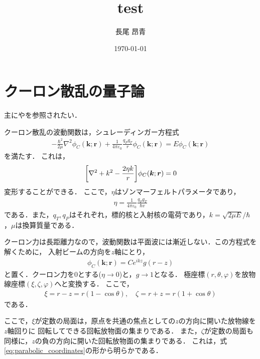 \documentclass[a4paper,11pt]{ltjsarticle}
\begin{document}
\title{test}
\author{長尾 昂青}
\date{\today}
\maketitle

\tableofcontents

\newpage
\section{クーロン散乱の量子論}

主に\cite{canto2013scattering}や\cite{BN00026961}を参照されたい．

クーロン散乱の波動関数は，シュレーディンガー方程式
\begin{align}\label{eq:coulomb_scattering_schrodinger}
  - \frac{\hbar^2}{2 \mu} \nabla^2 \phi_C(\bm{k}; \bm{r}) 
  + \frac{1}{4 \pi \varepsilon_0} \frac{q_P q_T}{r} \phi_C(\bm{k}; \bm{r}) = E\phi_C(\bm{k}; \bm{r})
\end{align}
を満たす．
これは，
\begin{align}\label{eq:coulomb_s_schro_rev}
  \qty[\nabla^2 + k^2- \frac{2\eta k}{r}] \phi_C(\bm{k}; \bm{r}) = 0
\end{align}
変形することができる．
ここで，$\eta$はゾンマーフェルトパラメータであり，
\begin{align}
  \eta = \frac{1}{4 \pi \varepsilon_0} \frac{q_P q_T}{\hbar v}
\end{align}
である．また，$q_T, q_P$はそれぞれ，標的核と入射核の電荷であり，$k = \sqrt{2\mu E}/\hbar$，$\mu$は換算質量である．

クーロン力は長距離力なので，波動関数は平面波には漸近しない．この方程式を解くために，
入射ビームの方向を$z$軸にとり，
\begin{align}\label{eq:coulomb_s_initial_ansatz}
  \phi_C(\bm{k};\bm{r}) = C e^{ikz}g(r-z)
\end{align}
と置く．クーロン力を0とする($\eta \rightarrow 0$)と，$ g \rightarrow 1$となる．
極座標$(r, \theta, \varphi)$を放物線座標$(\xi, \zeta, \varphi)$へと変換する．
ここで，
\begin{align}\label{eq:parabolic_coordinates}
  \xi = r-z = r(1-\cos \theta), \quad \zeta = r + z = r(1+ \cos \theta)
\end{align}
である．

ここで，$\xi$が定数の局面は，原点を共通の焦点としての$z$の方向に開いた放物線を$z$軸回りに
回転してできる回転放物面の集まりである．
また，$\zeta$が定数の局面も同様に，$z$の負の方向に開いた回転放物面の集まりである．
これは，式\ref{eq:parabolic_coordinates}の形から明らかである．
\end{document}
